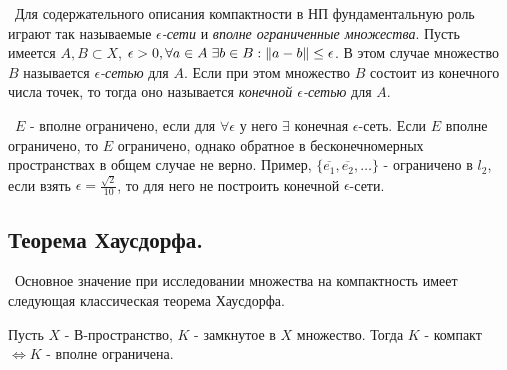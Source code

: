 \noindent\textasteriskcentered~Для содержательного описания компактности в НП фундаментальную роль играют так называемые \textit{$\epsilon$-сети}
и \textit{вполне ограниченные множества}. Пусть имеется $A, B \subset X$, $\epsilon > 0, \forall a \in A \; \exists b \in B : \left\lVert a - b\right\rVert \le \epsilon$. В этом случае 
множество $B$ называется \textit{$\epsilon$-сетью} для $A$. Если при этом множество $B$ состоит из конечного числа точек, то тогда оно называется \textit{конечной $\epsilon$-сетью} для $A$. 

\smallskip
\noindent\textasteriskcentered~$E$ - вполне ограничено, если для $\forall \epsilon$ у него $\exists$ конечная $\epsilon$-сеть. Если $E$ вполне ограничено, то $E$ 
ограничено, однако обратное в бесконечномерных пространствах в общем случае не верно. Пример, $\{ \overline{e_1}, \overline{e_2}, \dots\}$ - ограничено в $l_2$, если 
взять $\epsilon = \frac{\sqrt{2}}{10}$, то для него не построить конечной $\epsilon$-сети.


\subsection*{Теорема Хаусдорфа.}
\noindent\textbullet~Основное значение при исследовании множества на компактность имеет следующая классическая теорема Хаусдорфа.

\begin{theorem*}[Хаусдорф]
Пусть $X$ - В-пространство, $K$ - замкнутое в $X$ множество. Тогда $K$ - компакт $\Longleftrightarrow K$ - вполне ограничена. 
\end{theorem*}

